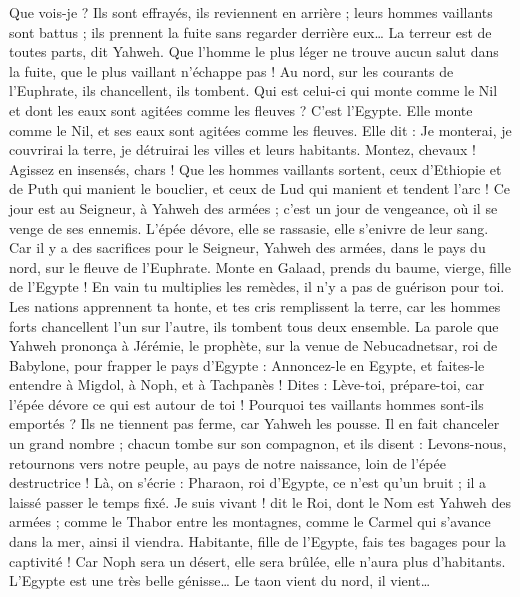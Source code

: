\begin{multicols}{2}
Que vois-je ? Ils sont effrayés, ils reviennent en arrière ; leurs hommes vaillants sont battus ; ils prennent la fuite sans regarder derrière eux… La terreur est de toutes parts, dit Yahweh.
Que l'homme le plus léger ne trouve aucun salut dans la fuite, que le plus vaillant n'échappe pas ! Au nord, sur les courants de l'Euphrate, ils chancellent, ils tombent.
Qui est celui-ci qui monte comme le Nil et dont les eaux sont agitées comme les fleuves ?
C'est l'Egypte. Elle monte comme le Nil, et ses eaux sont agitées comme les fleuves. Elle dit : Je monterai, je couvrirai la terre, je détruirai les villes et leurs habitants.
Montez, chevaux ! Agissez en insensés, chars ! Que les hommes vaillants sortent, ceux d'Ethiopie et de Puth qui manient le bouclier, et ceux de Lud qui manient et tendent l'arc !
Ce jour est au Seigneur, à Yahweh des armées ; c'est un jour de vengeance, où il se venge de ses ennemis. L'épée dévore, elle se rassasie, elle s'enivre de leur sang. Car il y a des sacrifices pour le Seigneur, Yahweh des armées, dans le pays du nord, sur le fleuve de l'Euphrate.
Monte en Galaad, prends du baume, vierge, fille de l'Egypte ! En vain tu multiplies les remèdes, il n'y a pas de guérison pour toi.
Les nations apprennent ta honte, et tes cris remplissent la terre, car les hommes forts chancellent l'un sur l'autre, ils tombent tous deux ensemble.
La parole que Yahweh prononça à Jérémie, le prophète, sur la venue de Nebucadnetsar, roi de Babylone, pour frapper le pays d'Egypte :
Annoncez-le en Egypte, et faites-le entendre à Migdol, à Noph, et à Tachpanès ! Dites : Lève-toi, prépare-toi, car l'épée dévore ce qui est autour de toi !
Pourquoi tes vaillants hommes sont-ils emportés ? Ils ne tiennent pas ferme, car Yahweh les pousse.
Il en fait chanceler un grand nombre ; chacun tombe sur son compagnon, et ils disent : Levons-nous, retournons vers notre peuple, au pays de notre naissance, loin de l'épée destructrice !
Là, on s'écrie : Pharaon, roi d'Egypte, ce n'est qu'un bruit ; il a laissé passer le temps fixé.
Je suis vivant ! dit le Roi, dont le Nom est Yahweh des armées ; comme le Thabor entre les montagnes, comme le Carmel qui s'avance dans la mer, ainsi il viendra.
Habitante, fille de l'Egypte, fais tes bagages pour la captivité ! Car Noph sera un désert, elle sera brûlée, elle n'aura plus d'habitants.
L'Egypte est une très belle génisse… Le taon vient du nord, il vient…

\end{multicols}
